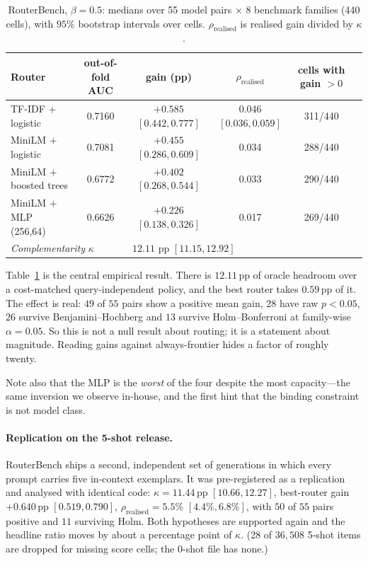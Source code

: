 \documentclass[10pt]{article}
\newcommand{\pp}{\,\text{pp}}
\begin{document}
\begin{table}[t]\centering\small
\caption{RouterBench, $\beta=0.5$: medians over 55 model pairs $\times$ 8
benchmark families (440 cells), with $95\%$ bootstrap intervals over cells.
$\rho_{\text{realised}}$ is realised gain divided by $\kappa$.}
\label{tab:rb}
\begin{tabular}{lccccc}
\toprule
Router & out-of-fold AUC & gain (pp) & $\rho_{\text{realised}}$ & cells with gain $>0$ \\
\midrule
TF-IDF $+$ logistic     & 0.7160 & $+0.585$ $[0.442,0.777]$ & 0.046 $[0.036,0.059]$ & 311/440 \\
MiniLM $+$ logistic     & 0.7081 & $+0.455$ $[0.286,0.609]$ & 0.034 & 288/440 \\
MiniLM $+$ boosted trees& 0.6772 & $+0.402$ $[0.268,0.544]$ & 0.033 & 290/440 \\
MiniLM $+$ MLP (256,64) & 0.6626 & $+0.226$ $[0.138,0.326]$ & 0.017 & 269/440 \\
\midrule
\multicolumn{2}{l}{\emph{Complementarity} $\kappa$} & \multicolumn{3}{l}{$\mathbf{12.11}$ pp $[11.15, 12.92]$} \\
\bottomrule
\end{tabular}
\end{table}

Table~\ref{tab:rb} is the central empirical result. There is $12.11\pp$ of
oracle headroom over a cost-matched query-independent policy, and the best
router takes $0.59\pp$ of it. The effect is real: $49$ of $55$ pairs show a
positive mean gain, $28$ have raw $p<0.05$, $26$ survive Benjamini--Hochberg
and $13$ survive Holm--Bonferroni at family-wise $\alpha=0.05$. So this is not a
null result about routing; it is a statement about magnitude. Reading gains
against always-frontier hides a factor of roughly twenty.

Note also that the MLP is the \emph{worst} of the four despite the most
capacity---the same inversion we observe in-house, and the first hint that the
binding constraint is not model class.

\paragraph{Replication on the 5-shot release.} RouterBench ships a second,
independent set of generations in which every prompt carries five in-context
exemplars. It was pre-registered as a replication and analysed with identical
code: $\kappa = 11.44\pp$ $[10.66, 12.27]$, best-router gain $+0.640\pp$
$[0.519, 0.790]$, $\rho_{\text{realised}} = 5.5\%$ $[4.4\%, 6.8\%]$, with $50$
of $55$ pairs positive and $11$ surviving Holm. Both hypotheses are supported
again and the headline ratio moves by about a percentage point of $\kappa$. (28
of $36{,}508$ 5-shot items are dropped for missing score cells; the 0-shot file
has none.)
\end{document}
